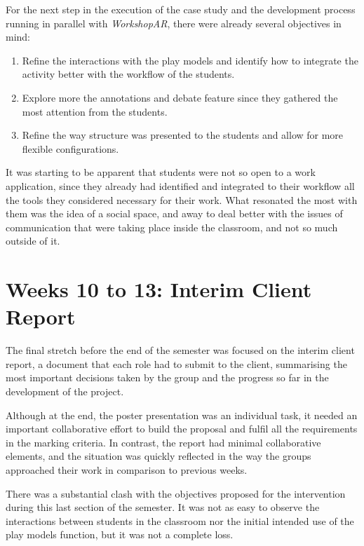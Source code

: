 For the next step in the execution of the case study and the development process running in parallel with \emph{WorkshopAR}, there were already several objectives in mind:

\begin{enumerate}
    \item Refine the interactions with the play models and identify how to integrate the activity better with the workflow of the students.
    \item Explore more the annotations and debate feature since they gathered the most attention from the students.
    \item Refine the way structure was presented to the students and allow for more flexible configurations.
\end{enumerate}

It was starting to be apparent that students were not so open to a work application, since they already had identified and integrated to their workflow all the tools they
considered necessary for their work. What resonated the most with them was the idea of a social space, and away to deal better with the issues of communication that were
taking place inside the classroom, and not so much outside of it.

\section{Weeks 10 to 13: Interim Client Report \label{sec:6-6}}

The final stretch before the end of the semester was focused on the interim client report, a document that each role had to submit to the client, summarising the most
important decisions taken by the group and the progress so far in the development of the project.

Although at the end, the poster presentation was an individual task, it needed an important collaborative effort to build the proposal and fulfil all the requirements in
the marking criteria. In contrast, the report had minimal collaborative elements, and the situation was quickly reflected in the way the groups approached their work in
comparison to previous weeks.

There was a substantial clash with the objectives proposed for the intervention during this last section of the semester. It was not as easy to observe the interactions
between students in the classroom nor the initial intended use of the play models function, but it was not a complete loss.

